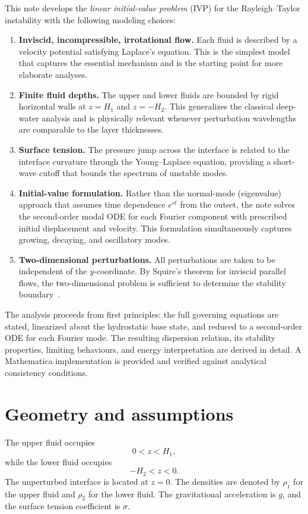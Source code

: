 \documentclass[11pt,a4paper]{article}
\begin{document}
This note develops the \emph{linear initial-value problem} (IVP) for the Rayleigh--Taylor instability with the following modeling choices:
\begin{enumerate}[leftmargin=*]
    \item \textbf{Inviscid, incompressible, irrotational flow.}  Each fluid is described by a velocity potential satisfying Laplace's equation.  This is the simplest model that captures the essential mechanism and is the starting point for more elaborate analyses.
    \item \textbf{Finite fluid depths.}  The upper and lower fluids are bounded by rigid horizontal walls at $z=H_1$ and $z=-H_2$.  This generalizes the classical deep-water analysis and is physically relevant whenever perturbation wavelengths are comparable to the layer thicknesses.
    \item \textbf{Surface tension.}  The pressure jump across the interface is related to the interface curvature through the Young--Laplace equation, providing a short-wave cutoff that bounds the spectrum of unstable modes.
    \item \textbf{Initial-value formulation.}  Rather than the normal-mode (eigenvalue) approach that assumes time dependence $e^{st}$ from the outset, the note solves the second-order modal ODE for each Fourier component with prescribed initial displacement and velocity.  This formulation simultaneously captures growing, decaying, and oscillatory modes.
    \item \textbf{Two-dimensional perturbations.}  All perturbations are taken to be independent of the $y$-coordinate.  By Squire's theorem for inviscid parallel flows, the two-dimensional problem is sufficient to determine the stability boundary~\cite{drazin_reid2004}.
\end{enumerate}
The analysis proceeds from first principles: the full governing equations are stated, linearized about the hydrostatic base state, and reduced to a second-order ODE for each Fourier mode.  The resulting dispersion relation, its stability properties, limiting behaviours, and energy interpretation are derived in detail.  A Mathematica implementation is provided and verified against analytical consistency conditions.

\section{Geometry and assumptions}

The upper fluid occupies
\begin{equation}
    0 < z < H_1,
\end{equation}
while the lower fluid occupies
\begin{equation}
    -H_2 < z < 0.
\end{equation}
The unperturbed interface is located at $z=0$.  The densities are denoted by $\rho_1$ for the upper fluid and $\rho_2$ for the lower fluid.  The gravitational acceleration is $g$, and the surface tension coefficient is $\sigma$.
\end{document}
